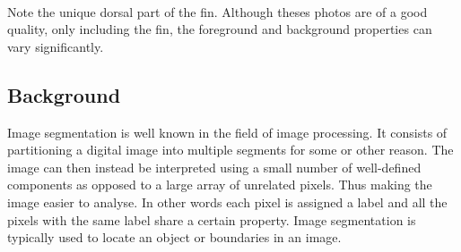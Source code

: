 \documentclass[a4paper,10pt]{article}
\begin{document}
\begin{figure}[H]
\centering
\mbox{ \quad
{} \quad
{}}
\end{figure}

Note the unique dorsal part of the fin.  Although theses photos are of a good
quality, only including the fin, the foreground and background properties can
vary significantly.


\subsection{Background}
Image segmentation is well known in the field of image processing.  It consists
of partitioning a digital image into multiple segments for some or other reason.
 The image can then instead be interpreted using a small number of well-defined 
 components as opposed to a large array of unrelated pixels.  Thus making the
image easier to analyse.  
 In other words each pixel is
assigned a label and all the pixels with the same label share a certain
property.  Image segmentation is typically used to locate an object or
boundaries in an image. \\
\end{document}
